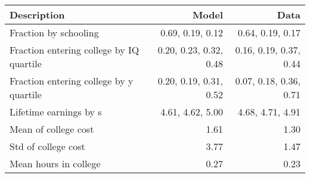 \begin{tabular}{lrr}
\hline
Description & Model  & Data  \\
\hline
Fraction by schooling & 0.69, 0.19, 0.12  & 0.64, 0.19, 0.17  \\
Fraction entering college by IQ quartile & 0.20, 0.23, 0.32, 0.48  & 0.16, 0.19, 0.37, 0.44  \\
Fraction entering college by y quartile & 0.20, 0.19, 0.31, 0.52  & 0.07, 0.18, 0.36, 0.71  \\
Lifetime earnings by s & 4.61, 4.62, 5.00  & 4.68, 4.71, 4.91  \\
Mean of college cost & 1.61  & 1.30  \\
Std of college cost & 3.77  & 1.47  \\
Mean hours in college & 0.27  & 0.23  \\
\hline
\end{tabular}%
